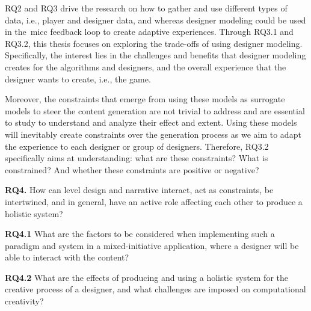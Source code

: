 RQ2 and RQ3 drive the research on how to gather and use different types of data, i.e., player and designer data, and whereas designer modeling could be used in the~\acrshort{micc} feedback loop to create adaptive experiences. Through RQ3.1 and RQ3.2, this thesis focuses on exploring the trade-offs of using designer modeling. Specifically, the interest lies in the challenges and benefits that designer modeling creates for the algorithms and designers, and the overall experience that the designer wants to create, i.e., the game. 

Moreover, the constraints that emerge from using these models as surrogate models to steer the content generation are not trivial to address and are essential to study to understand and analyze their effect and extent. Using these models will inevitably create constraints over the generation process as we aim to adapt the experience to each designer or group of designers. Therefore, RQ3.2 specifically aims at understanding: what are these constraints? What is constrained? And whether these constraints are positive or negative? 

\begin{retQuestion}{}
   \textbf{RQ4.} How can level design and narrative interact, act as constraints, be intertwined, and in general, have an active role affecting each other to produce a holistic system? 
   
   
   \begin{retQuestion}{}
        \textbf{RQ4.1} What are the factors to be considered when implementing such a paradigm and system in a mixed-initiative application, where a designer will be able to interact with the content?
    \end{retQuestion}
    
    \begin{retQuestion}{}
        \textbf{RQ4.2} What are the effects of producing and using a holistic system for the creative process of a designer, and what challenges are imposed on computational creativity? 
    \end{retQuestion}
   
\end{retQuestion}

